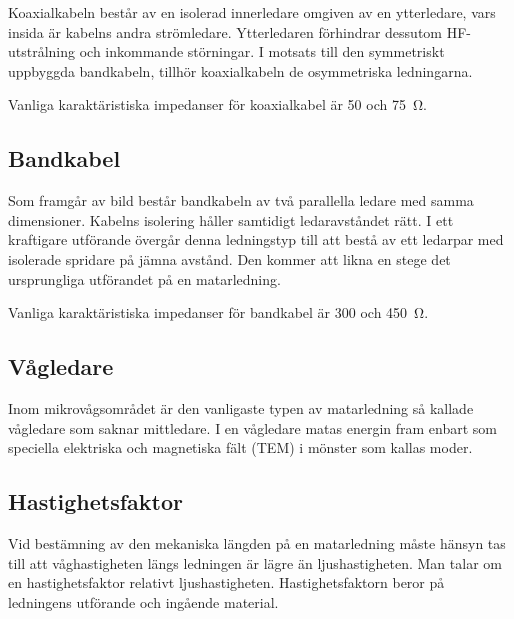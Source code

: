 Koaxialkabeln består av en isolerad innerledare omgiven av en ytterledare, vars
insida är kabelns andra strömledare.
Ytterledaren förhindrar dessutom HF-utstrålning och inkommande störningar.
I motsats till den symmetriskt uppbyggda bandkabeln, tillhör
koaxialkabeln de osymmetriska ledningarna.

Vanliga karaktäristiska impedanser för koaxialkabel är 50 och \qty{75}{\ohm}.

\subsection{Bandkabel}


Som framgår av bild  består bandkabeln av två parallella
ledare med samma dimensioner.
Kabelns isolering håller samtidigt ledaravståndet rätt.
I ett kraftigare utförande övergår denna ledningstyp till att bestå av ett
ledarpar med isolerade spridare på jämna avstånd.
Den kommer att likna en stege det ursprungliga utförandet på en matarledning.

Vanliga karaktäristiska impedanser för bandkabel är 300 och \qty{450}{\ohm}.

\subsection{Vågledare}

Inom mikrovågsområdet är den vanligaste typen av matarledning så kallade
vågledare som saknar mittledare.
I en vågledare matas energin fram enbart som speciella elektriska och
magnetiska fält (TEM) i mönster som kallas moder.

\subsection{Hastighetsfaktor}

Vid bestämning av den mekaniska längden på en matarledning måste hänsyn tas
till att våghastigheten längs ledningen är lägre än ljushastigheten.
Man talar om en hastighetsfaktor relativt ljushastigheten.
Hastighetsfaktorn beror på ledningens utförande och ingående material.

